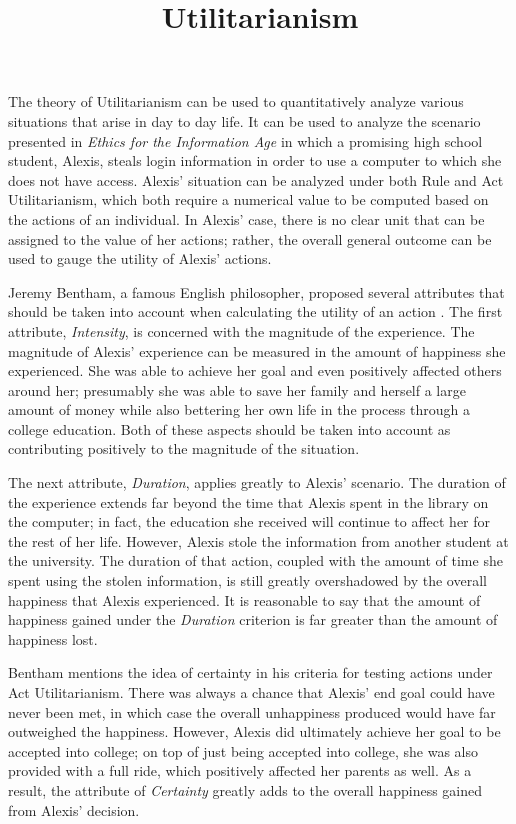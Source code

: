 \documentclass{paper}
\title{Utilitarianism}
\begin{document}
\drafth{}
\inlinetitle
\begin{linenumbers}
The theory of Utilitarianism can be used to quantitatively analyze various situations that arise in day to day life. It can be used to analyze the scenario presented in \textit{Ethics for the Information Age} in which a promising high school student, Alexis, steals login information in order to use a computer to which she does not have access. Alexis' situation can be analyzed under both Rule and Act Utilitarianism, which both require a numerical value to be computed based on the actions of an individual. In Alexis' case, there is no clear unit that can be assigned to the value of her actions; rather, the overall general outcome can be used to gauge the utility of Alexis' actions.

Jeremy Bentham, a famous English philosopher, proposed several attributes that should be taken into account when calculating the utility of an action \cite[75]{ethics}. The first attribute, \textit{Intensity}, is concerned with the magnitude of the experience. The magnitude of Alexis' experience can be measured in the amount of happiness she experienced. She was able to achieve her goal and even positively affected others around her; presumably she was able to save her family and herself a large amount of money while also bettering her own life in the process through a college education. Both of these aspects should be taken into account as contributing positively to the magnitude of the situation.

The next attribute, \textit{Duration}, applies greatly to Alexis' scenario. The duration of the experience extends far beyond the time that Alexis spent in the library on the computer; in fact, the education she received will continue to affect her for the rest of her life. However, Alexis stole the information from another student at the university. The duration of that action, coupled with the amount of time she spent using the stolen information, is still greatly overshadowed by the overall happiness that Alexis experienced. It is reasonable to say that the amount of happiness gained under the \textit{Duration} criterion is far greater than the amount of happiness lost.

Bentham mentions the idea of certainty in his criteria for testing actions under Act Utilitarianism. There was always a chance that Alexis' end goal could have never been met, in which case the overall unhappiness produced would have far outweighed the happiness. However, Alexis did ultimately achieve her goal to be accepted into college; on top of just being accepted into college, she was also provided with a full ride, which positively affected her parents as well. As a result, the attribute of \textit{Certainty} greatly adds to the overall happiness gained from Alexis' decision.


\end{linenumbers}
\end{document}

